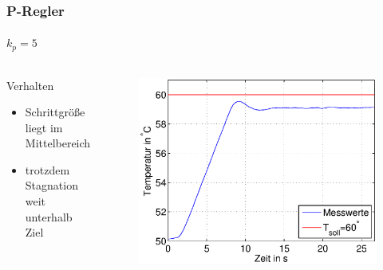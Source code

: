 \begin{frame}
    \frametitle{P-Regler}
    \framesubtitle{$k_p=5$}
    \begin{columns}[c]
            \begin{block}{Verhalten}
                \begin{itemize}
                    \item Schrittgröße liegt im Mittelbereich
                    \item trotzdem Stagnation weit unterhalb Ziel
                \end{itemize}
            \end{block}
        \begin{figure}[H]
        \begin{center}
                \includegraphics[scale=0.4]{./img/plots/Auf_2_b_1.eps}
        \end{center}
        \end{figure}
     \end{columns}
\end{frame}

